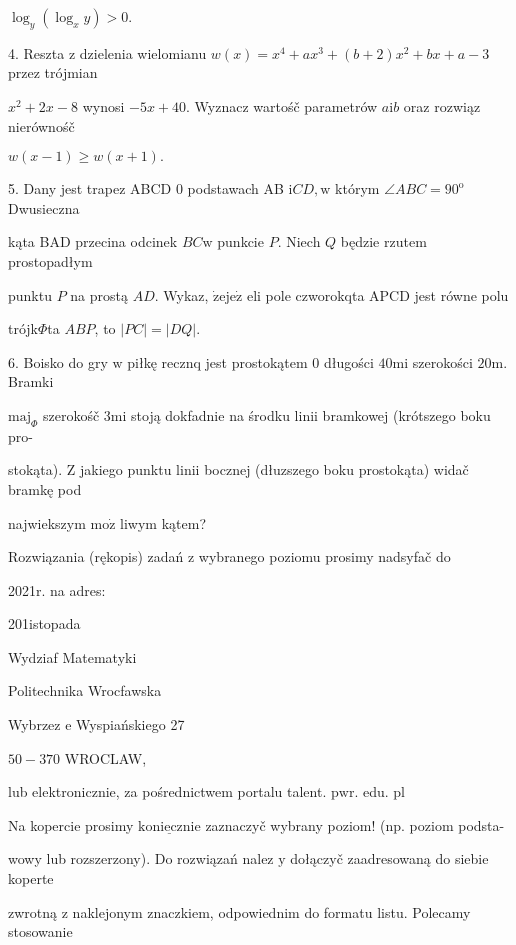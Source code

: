 \documentclass[a4paper,12pt]{article}
\begin{document}
$\log_{y}(\log_{x}y)>0.$

4. Reszta $\mathrm{z}$ dzielenia wielomianu $w(x)=x^{4}+ax^{3}+(b+2)x^{2}+bx+a-3$ przez trójmian

$x^{2}+2x-8$ wynosi $-5x+40$. Wyznacz wartośč parametrów $a\mathrm{i}b$ oraz rozwiąz nierównośč

$w(x-1)\geq w(x+1).$

5. Dany jest trapez ABCD $0$ podstawach AB $\mathrm{i}CD, \mathrm{w}$ którym $\angle ABC=90^{\mathrm{o}}$ Dwusieczna

kąta BAD przecina odcinek $BC\mathrm{w}$ punkcie $P$. Niech $Q$ będzie rzutem prostopadłym

punktu $P$ na prostą $AD$. Wykaz, $\dot{\mathrm{z}}\mathrm{e}\mathrm{j}\mathrm{e}\dot{\mathrm{z}}$ eli pole czworokqta APCD jest równe polu

trójk$\Phi$ta $ABP$, to $|PC|=|DQ|.$

6. Boisko do gry $\mathrm{w}$ piłkę recznq jest prostokątem $0$ długości $40\mathrm{m}\mathrm{i}$ szerokości $20\mathrm{m}$. Bramki

$\mathrm{m}\mathrm{a}\mathrm{j}_{\Phi}$ szerokośč $3\mathrm{m}\mathrm{i}$ stoją dokfadnie na środku linii bramkowej (krótszego boku pro-

stokąta). $\mathrm{Z}$ jakiego punktu linii bocznej (dłuzszego boku prostokąta) widač bramkę pod

najwiekszym $\mathrm{m}\mathrm{o}\dot{\mathrm{z}}$ liwym kątem?

Rozwiązania (rękopis) zadań z wybranego poziomu prosimy nadsyfač do

2021r. na adres:

201istopada

Wydziaf Matematyki

Politechnika Wrocfawska

Wybrzez $\mathrm{e}$ Wyspiańskiego 27

$50-370$ WROCLAW,

lub elektronicznie, za pośrednictwem portalu talent. $\mathrm{p}\mathrm{w}\mathrm{r}$. edu. pl

Na kopercie prosimy $\underline{\mathrm{k}\mathrm{o}\mathrm{n}\mathrm{i}\mathrm{e}\mathrm{c}\mathrm{z}\mathrm{n}\mathrm{i}\mathrm{e}}$ zaznaczyč wybrany poziom! (np. poziom podsta-

wowy lub rozszerzony). Do rozwiązań nalez $\mathrm{y}$ dołączyč zaadresowaną do siebie koperte

zwrotną $\mathrm{z}$ naklejonym znaczkiem, odpowiednim do formatu listu. Polecamy stosowanie
\end{document}
